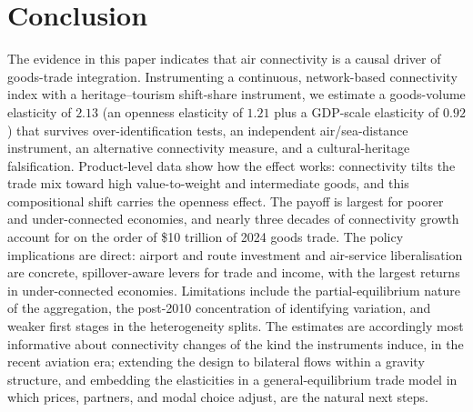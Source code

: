 \section{Conclusion}
\label{sec:conclusion}
The evidence in this paper indicates that air connectivity is a causal driver
of goods-trade integration. Instrumenting a
continuous, network-based connectivity index with a heritage--tourism
shift-share instrument, we estimate a goods-volume elasticity of $2.13$ (an openness elasticity of $1.21$ plus a GDP-scale elasticity of $0.92$) that
survives over-identification tests, an independent air/sea-distance instrument,
an alternative connectivity measure, and a cultural-heritage falsification.
Product-level data show how the effect works: connectivity tilts the trade mix
toward high value-to-weight and intermediate goods, and this compositional shift carries the openness effect. The payoff is largest for poorer and
under-connected economies, and nearly three decades of connectivity growth account for on the order of \$10 trillion of 2024 goods trade. The policy implications are
direct: airport and route investment and air-service liberalisation are
concrete, spillover-aware levers for trade and income, with the largest returns
in under-connected economies. Limitations include the partial-equilibrium nature of
the aggregation, the post-2010 concentration of identifying variation, and
weaker first stages in the heterogeneity splits. The estimates are
accordingly most informative about connectivity changes of the kind the
instruments induce, in the recent aviation era; extending the design to
bilateral flows within a gravity structure, and embedding the elasticities in
a general-equilibrium trade model in which prices, partners, and modal choice
adjust, are the natural next steps.

\appendix
